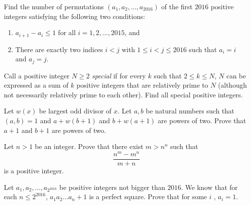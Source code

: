 \documentclass[problems.tex]{subfile}
\begin{document}
	\begin{problem}
		Find the number of permutations $(a_1, a_2, \dots, a_{2016})$ of the first $2016$ positive integers satisfying the following two conditions:
		\begin{enumerate}
			\item $a_{i+1} - a_i \leq 1$ for all $i =1 , 2, \dots, 2015$, and
			\item There are exactly two indices $i < j$ with $1 \leq i < j \leq 2016$ such that $a_i = i$ and $a_j = j$.
		\end{enumerate}
	\end{problem}



	\begin{problem}
		Call a positive integer $N \geq 2$ \textit{special} if for every $k$ such that $2 \leq k \leq N$, $N$ can be expressed as a sum of $k$ positive integers that are relatively prime to $N$ (although not necessarily relatively prime to each other). Find all special positive integers.
	\end{problem}



	\begin{problem}
		Let $w(x)$ be largest odd divisor of $x$. Let $a,b$ be natural numbers such that $(a,b)=1$ and $a+w(b+1)$ and $b+w(a+1)$ are powers of two. Prove that $a+1$ and $b+1$ are powers of two. %
	\end{problem}



	\begin{problem}
		Let $n>1$ be an integer. Prove that there exist $m>n^n $ such that $$\frac {n^m-m^n}{m+n}$$ is a positive integer. %
	\end{problem}




	\begin{problem}
		Let $a_1, a_2, \dots, a_{2^{2016}}$ be positive integers not bigger than $2016$. We know that for each $n \leq 2^{2016}$, $a_1a_2 \dots a_{n} +1 $ is a perfect square. Prove that for some $i $ , $a_i=1$. %
	\end{problem}
\end{document}
